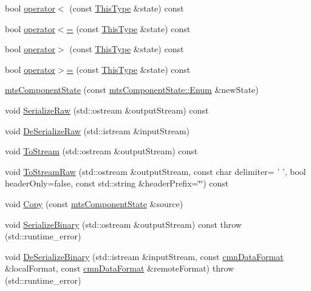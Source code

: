 \begin{DoxyCompactItemize}
bool \hyperlink{classmts_component_state_a54b72ce4c76fa7a03d4a98034d60a0ba}{operator$<$} (const \hyperlink{classmts_component_state_a668efaf1bf3c84a5448587f04d7312b5}{This\-Type} \&state) const 
\item 
bool \hyperlink{classmts_component_state_ae149358392cd85905993ea1998e90a71}{operator$<$=} (const \hyperlink{classmts_component_state_a668efaf1bf3c84a5448587f04d7312b5}{This\-Type} \&state) const 
\item 
bool \hyperlink{classmts_component_state_a45664f92ca298f7dde6515b3b9c7e417}{operator$>$} (const \hyperlink{classmts_component_state_a668efaf1bf3c84a5448587f04d7312b5}{This\-Type} \&state) const 
\item 
bool \hyperlink{classmts_component_state_aab2851a3e9ac31bc4395ea8101cae73b}{operator$>$=} (const \hyperlink{classmts_component_state_a668efaf1bf3c84a5448587f04d7312b5}{This\-Type} \&state) const 
\item 
\hyperlink{classmts_component_state_aeaa1d25fc7ba8fa4de98a4a3e340d02a}{mts\-Component\-State} (const \hyperlink{classmts_component_state_a1158e4d2d79fff671354909e87f58928}{mts\-Component\-State\-::\-Enum} \&new\-State)
\item 
void \hyperlink{classmts_component_state_a4d328200a2f9185b1451725909f9f793}{Serialize\-Raw} (std\-::ostream \&output\-Stream) const 
\item 
void \hyperlink{classmts_component_state_a7437a5e0391ac0ba24c3b30990bf2b3f}{De\-Serialize\-Raw} (std\-::istream \&input\-Stream)
\item 
void \hyperlink{classmts_component_state_a7dd43d11ff1ebd0804c1211591c46484}{To\-Stream} (std\-::ostream \&output\-Stream) const 
\item 
void \hyperlink{classmts_component_state_a10b31cd7c1c66442040c65ba97de011a}{To\-Stream\-Raw} (std\-::ostream \&output\-Stream, const char delimiter= ' ', bool header\-Only=false, const std\-::string \&header\-Prefix=\char`\"{}\char`\"{}) const 
\item 
void \hyperlink{classmts_component_state_ab1add6489caa0e859e57cff25d993980}{Copy} (const \hyperlink{classmts_component_state}{mts\-Component\-State} \&source)
\item 
void \hyperlink{classmts_component_state_a9f938ded40257344be1125497c1adac3}{Serialize\-Binary} (std\-::ostream \&output\-Stream) const   throw (std\-::runtime\-\_\-error)
\item 
void \hyperlink{classmts_component_state_a8d79212ec7a9b187187ab598c735f544}{De\-Serialize\-Binary} (std\-::istream \&input\-Stream, const \hyperlink{classcmn_data_format}{cmn\-Data\-Format} \&local\-Format, const \hyperlink{classcmn_data_format}{cmn\-Data\-Format} \&remote\-Format)  throw (std\-::runtime\-\_\-error)

\end{DoxyCompactItemize}
